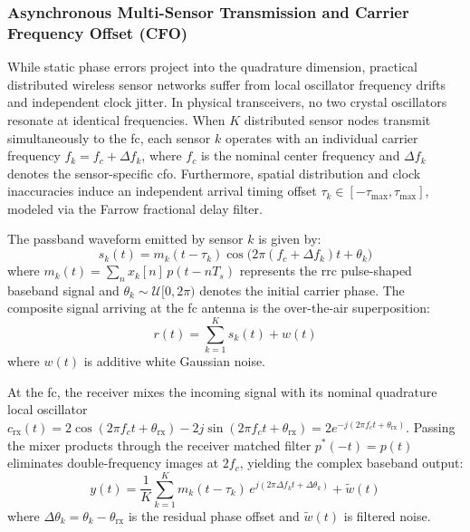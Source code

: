 \documentclass[Markos_Delaportas_1316.tex]{subfiles}
\begin{document}
\subsubsection{Asynchronous Multi-Sensor Transmission and Carrier
Frequency Offset (CFO)}
\label{subsubsec:async_cfo_effects}
While static phase errors project into the quadrature dimension, practical
distributed wireless sensor networks suffer from local oscillator frequency
drifts and independent clock jitter. In physical transceivers, no two crystal
oscillators resonate at identical frequencies. When $K$ distributed sensor
nodes transmit simultaneously to the \gls{fc}, each sensor $k$ operates with
an individual carrier frequency $f_k = f_c + \Delta f_k$, where $f_c$ is the
nominal center frequency and $\Delta f_k$ denotes the sensor-specific \gls{cfo}.
Furthermore, spatial distribution and clock inaccuracies induce an independent
arrival timing offset $\tau_k \in [-\tau_{\max}, \tau_{\max}]$, modeled via
the Farrow fractional delay filter.

The passband waveform emitted by sensor $k$ is given by:
\begin{equation}
    s_k(t) = m_k(t - \tau_k) \cos\Big(2\pi (f_c + \Delta f_k) t + \theta_k\Big)
    \label{eq:async_sensor_passband_tx}
\end{equation}
where $m_k(t) = \sum_n x_k[n] \, p(t - n T_s)$ represents the
\gls{rrc} pulse-shaped
baseband signal and $\theta_k \sim \mathcal{U}[0, 2\pi)$ denotes the
initial carrier phase.
The composite signal arriving at the \gls{fc} antenna is the
over-the-air superposition:
\begin{equation}
    r(t) = \sum_{k=1}^K s_k(t) + w(t)
    \label{eq:async_ota_superposition}
\end{equation}
where $w(t)$ is additive white Gaussian noise.

At the \gls{fc}, the receiver mixes the incoming signal with its
nominal quadrature
local oscillator $c_{\text{rx}}(t) = 2 \cos(2\pi f_c t +
\theta_{\text{rx}}) - 2j \sin(2\pi f_c t + \theta_{\text{rx}}) = 2
e^{-j(2\pi f_c t + \theta_{\text{rx}})}$.
Passing the mixer products through the receiver matched filter $p^*(-t) = p(t)$
eliminates double-frequency images at $2f_c$, yielding the complex
baseband output:
\begin{equation}
    y(t) = \frac{1}{K}\sum_{k=1}^K m_k(t - \tau_k) \, e^{j(2\pi
    \Delta f_k t + \Delta \theta_k)} + \tilde{w}(t)
    \label{eq:async_downconverted_complex_sum}
\end{equation}
where $\Delta \theta_k = \theta_k - \theta_{\text{rx}}$ is the
residual phase offset
and $\tilde{w}(t)$ is filtered noise.
\end{document}
